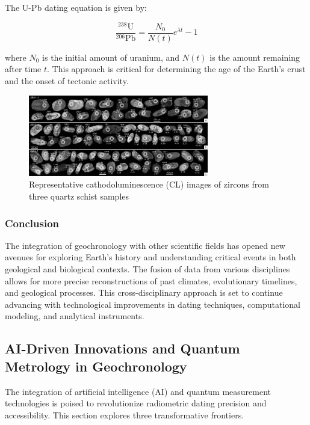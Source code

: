 \documentclass{article}
\begin{document}
The U-Pb dating equation is given by:

\begin{equation}
\frac{^{238}\text{U}}{^{206}\text{Pb}} = \frac{N_0}{N(t)} e^{\lambda t} - 1
\end{equation}

where \(N_0\) is the initial amount of uranium, and \(N(t)\) is the amount remaining after time \(t\). This approach is critical for determining the age of the Earth's crust and the onset of tectonic activity.

\begin{figure}
    \centering
    \includegraphics[width=0.7\textwidth]{UPb.jpg}
    \caption{Representative cathodoluminescence (CL) images of zircons from three quartz schist samples}
    \label{fig:UPb}
\end{figure}

\subsubsection*{Conclusion}

The integration of geochronology with other scientific fields has opened new avenues for exploring Earth's history and understanding critical events in both geological and biological contexts. The fusion of data from various disciplines allows for more precise reconstructions of past climates, evolutionary timelines, and geological processes. This cross-disciplinary approach is set to continue advancing with technological improvements in dating techniques, computational modeling, and analytical instruments.

\subsection{AI-Driven Innovations and Quantum Metrology in Geochronology}
\label{subsec:quantum_ai}

The integration of artificial intelligence (AI) and quantum measurement technologies is poised to revolutionize radiometric dating precision and accessibility. This section explores three transformative frontiers.
\end{document}
